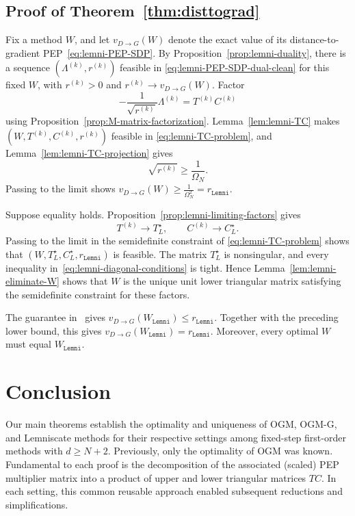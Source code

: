 \documentclass[11pt]{article}
\begin{document}
\subsection{Proof of Theorem~\ref{thm:disttograd}}
Fix a method $W$, and let $v_{D\rightarrow G}(W)$ denote the exact value of its
distance-to-gradient PEP~\eqref{eq:lemni-PEP-SDP}. By Proposition~\ref{prop:lemni-duality}, there is a
sequence $(\Lambda^{(k)},r^{(k)})$ feasible in
\eqref{eq:lemni-PEP-SDP-dual-clean} for this fixed $W$, with $r^{(k)}>0$ and
$r^{(k)}\to v_{D\rightarrow G}(W)$. Factor
\[
    -\frac1{\sqrt{r^{(k)}}}\Lambda^{(k)}=T^{(k)}C^{(k)}
\]
using Proposition~\ref{prop:M-matrix-factorization}. Lemma~\ref{lem:lemni-TC}
makes $(W,T^{(k)},C^{(k)},r^{(k)})$ feasible in
\eqref{eq:lemni-TC-problem}, and Lemma~\ref{lem:lemni-TC-projection} gives
\[
    \sqrt{r^{(k)}}\geq\frac1{\Omega_N}.
\]
Passing to the limit shows $ v_{D\rightarrow G}(W)\geq\frac1{\Omega_N^2}=r_\mathtt{Lemni}$.

Suppose equality holds. Proposition~\ref{prop:lemni-limiting-factors} gives
\[
    T^{(k)}\to T_L^\star,
    \qquad
    C^{(k)}\to C_L^\star.
\]
Passing to the limit in the semidefinite constraint of
\eqref{eq:lemni-TC-problem} shows that
$(W,T_L^\star,C_L^\star,r_\mathtt{Lemni})$ is feasible. The matrix
$T_L^\star$ is nonsingular, and
every inequality in~\eqref{eq:lemni-diagonal-conditions} is tight. Hence
Lemma~\ref{lem:lemni-eliminate-W} shows that $W$ is the unique unit lower
triangular matrix satisfying the semidefinite constraint for these factors.

The guarantee in~\cite{KimRyuDasGupta26} gives $v_{D\rightarrow G}(W_\mathtt{Lemni})\leq r_\mathtt{Lemni}$.
Together with the preceding lower bound, this gives
$v_{D\rightarrow G}(W_\mathtt{Lemni})=r_\mathtt{Lemni}$. Moreover, every optimal $W$ must equal $W_\mathtt{Lemni}$.



\section{Conclusion}
Our main theorems establish the optimality and uniqueness of OGM, OGM-G, and Lemniscate methods for their respective settings among fixed-step first-order methods with $d\geq N+2$. Previously, only the optimality of OGM was known. Fundamental to each proof is the decomposition of the associated (scaled) PEP multiplier matrix into a product of upper and lower triangular matrices $TC$. In each setting, this common reusable approach enabled subsequent reductions and simplifications.
\end{document}
